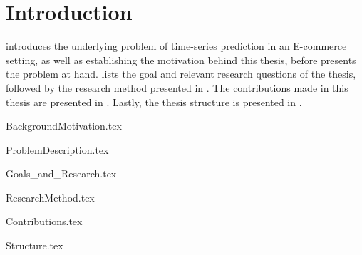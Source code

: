 \chapter{Introduction}
\label{cha:Introduction}

introduces the underlying problem of time-series prediction in an E-commerce setting,
as well as establishing the motivation behind this thesis,
before 
presents the problem at hand.
 lists the goal and relevant research questions of the thesis,
followed by the research method presented in .
The contributions made in this thesis are presented in .
Lastly, the thesis structure is presented in .



{BackgroundMotivation.tex}

{ProblemDescription.tex}

{Goals_and_Research.tex}

{ResearchMethod.tex}

{Contributions.tex}

{Structure.tex}
